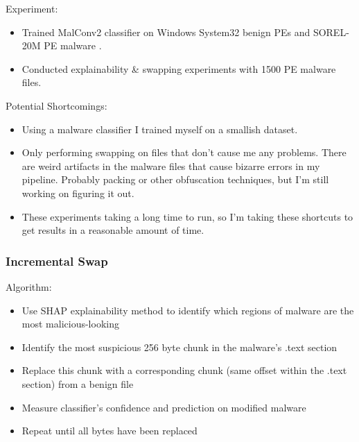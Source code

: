 \documentclass{article}
\begin{document}
Experiment:
\begin{itemize}
	\item Trained MalConv2 classifier on Windows System32 benign PEs and SOREL-20M PE malware .
	\item Conducted explainability \& swapping experiments with 1500 PE malware files.
\end{itemize}
Potential Shortcomings:
\begin{itemize}
	\item Using a malware classifier I trained myself on a smallish dataset.
	\item Only performing swapping on files that don't cause me any problems. There are weird artifacts in the malware files that cause bizarre errors in my pipeline. Probably packing or other obfuscation techniques, but I'm still working on figuring it out.
	\item These experiments taking a long time to run, so I'm taking these shortcuts to get results in a reasonable amount of time.
\end{itemize}

\subsubsection*{Incremental Swap}

Algorithm:
\begin{itemize}
	\item Use SHAP explainability method to identify which regions of  malware are the most malicious-looking
	\item Identify the most suspicious 256 byte chunk in the malware's .text section
	\item Replace this chunk with a corresponding chunk (same offset within the .text section) from a benign file
	\item Measure classifier's confidence and prediction on modified malware
	\item Repeat until all bytes have been replaced
\end{itemize}
\end{document}
